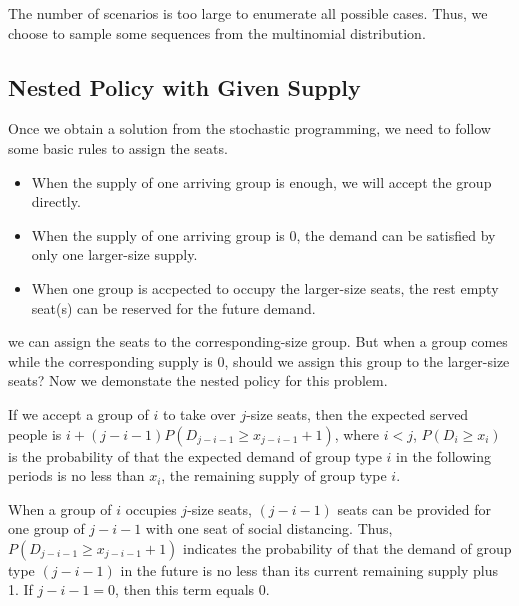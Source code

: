 The number of scenarios is too large to enumerate all possible cases.
Thus, we choose to sample some sequences from the multinomial distribution.




\subsection{Nested Policy with Given Supply}\label{nested_policy}

Once we obtain a solution from the stochastic programming, we need to follow some basic rules to assign the seats.
\begin{itemize}
    \item When the supply of one arriving group is enough, we will accept the group directly.
    \item When the supply of one arriving group is 0, the demand can be satisfied by only one larger-size supply.
    \item When one group is accpected to occupy the larger-size seats, the rest empty seat(s) can be reserved for the future demand.
\end{itemize}

we can assign the seats to the corresponding-size group. But when a group comes while the corresponding supply is 0, should we assign this group to the larger-size seats? Now we demonstate the nested policy for this problem.

If we accept a group of $i$ to take over $j$-size seats, then the expected served people is $i + (j-i-1)P(D_{j-i-1} \geq x_{j-i-1}+1)$, where $i < j$, $P(D_i \geq x_i)$ is the probability of that the expected demand of group type $i$ in the following periods is no less than $x_i$, the remaining supply of group type $i$.

When a group of $i$ occupies $j$-size seats, $(j-i-1)$ seats can be provided for one group of $j-i-1$ with one seat of social distancing.
Thus, $P(D_{j-i-1} \geq x_{j-i-1}+1)$ indicates the probability of that the demand of group type $(j-i-1)$ in the future is no less than its current remaining supply plus 1. If $j -i-1 =0$, then this term equals 0.

